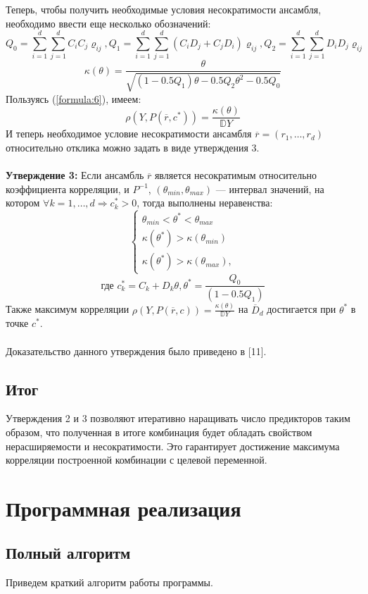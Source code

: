 \documentclass{article}
\begin{document}
Теперь, чтобы получить необходимые условия несократимости ансамбля, необходимо ввести еще несколько обозначений: \\
$$
Q_0 = \sum_{i=1}^{d} \sum_{j=1}^{d} C_i C_j \varrho_{ij}, Q_1 = \sum_{i=1}^{d} \sum_{j=1}^{d} (C_i D_j  + C_j D_i)\varrho_{ij}, Q_2 = \sum_{i=1}^{d} \sum_{j=1}^{d} D_i D_j \varrho_{ij}
$$
$$
\kappa(\theta) = \frac{\theta}{\sqrt{(1- 0.5 Q_1)\theta - 0.5 Q_2 \theta^2 - 0.5 Q_0}}
$$
Пользуясь (\ref{formula:6}), имеем:
$$
\rho(Y, P(\overline{r}, c^*)) = \frac{\kappa(\theta)}{\mathbb{D}Y}
$$
И теперь необходимое условие несократимости ансамбля $\overline{r} = (r_1, \dots, r_d)$ относительно отклика можно задать в виде утверждения 3. \\ \\
\textbf{Утверждение 3:} Если ансамбль $\overline{r}$ является несократимым относительно коэффициента корреляции, и \exists $P^{-1}$, $(\theta_{min}, \theta_{max})$ — интервал значений, на котором $\forall k = 1, \dots, d \Rightarrow c^*_k > 0$, тогда выполнены неравенства: \\
$$
\begin{cases}
    \theta_{min} < \theta^* < \theta_{max} \\
    \kappa(\theta^*) > \kappa(\theta_{min}) \\ 
    \kappa(\theta^*) > \kappa(\theta_{max}), 
\end{cases}
$$
$$\text{где } c_k^* = C_k + D_k \theta, \theta^* = \frac{Q_0}{(1- 0.5 Q_1)}$$
Также максимум корреляции $\rho(Y, P(\overline{r}, c)) = \frac{\kappa(\theta)}{\mathbb{D}Y}$ на $\overline{D}_d$ достигается при $\theta^*$ в точке $c^*$. \\ \\
Доказательство данного утверждения было приведено в [11].
\subsection{Итог}
Утверждения 2 и 3 позволяют итеративно наращивать число предикторов таким образом, что полученная в итоге комбинация будет обладать свойством нерасширяемости и несократимости. Это гарантирует достижение максимума корреляции построенной комбинации с целевой переменной.
\section{Программная реализация}
\subsection{Полный алгоритм}
Приведем краткий алгоритм работы программы.
\end{document}
